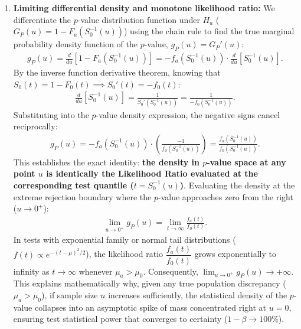 \begin{solproblema}
\begin{enumerate}
		\item \textbf{Limiting differential density and monotone likelihood ratio:}
		We differentiate the $p$-value distribution function under $H_a$ ($G_P(u) = 1 - F_a(S_0^{-1}(u))$) using the chain rule to find the true marginal probability density function of the $p$-value, $g_P(u) = G_P'(u)$:
		\begin{align}
			g_P(u) = \frac{d}{du}\left[ 1 - F_a\left( S_0^{-1}(u) \right) \right] = -f_a\left( S_0^{-1}(u) \right) \cdot \frac{d}{du}\left[ S_0^{-1}(u) \right].
		\end{align}
		By the inverse function derivative theorem, knowing that $S_0(t) = 1 - F_0(t) \implies S_0'(t) = -f_0(t)$:
		\begin{align}
			\frac{d}{du}\left[ S_0^{-1}(u) \right] = \frac{1}{S_0'\left( S_0^{-1}(u) \right)} = \frac{1}{-f_0\left( S_0^{-1}(u) \right)}.
		\end{align}
		Substituting into the $p$-value density expression, the negative signs cancel reciprocally:
		\begin{align}
			g_P(u) = -f_a\left( S_0^{-1}(u) \right) \cdot \left( \frac{-1}{f_0\left( S_0^{-1}(u) \right)} \right) = \frac{f_a\left( S_0^{-1}(u) \right)}{f_0\left( S_0^{-1}(u) \right)}.
		\end{align}
		This establishes the exact identity: \textbf{the density in $p$-value space at any point $u$ is identically the Likelihood Ratio evaluated at the corresponding test quantile ($t = S_0^{-1}(u)$)}.
		Evaluating the density at the extreme rejection boundary where the $p$-value approaches zero from the right ($u \to 0^+$):
		\begin{align}
			\lim_{u \to 0^+} g_P(u) = \lim_{t \to \infty} \frac{f_a(t)}{f_0(t)}.
		\end{align}
		In tests with exponential family or normal tail distributions ($f(t) \propto e^{-(t-\mu)^2/2}$), the likelihood ratio $\dfrac{f_a(t)}{f_0(t)}$ grows exponentially to infinity as $t \to \infty$ whenever $\mu_a > \mu_0$.
		Consequently, $\lim_{u \to 0^+} g_P(u) \to +\infty$.
		This explains mathematically why, given any true population discrepancy ($\mu_a > \mu_0$), if sample size $n$ increases sufficiently, the statistical density of the $p$-value collapses into an asymptotic spike of mass concentrated right at $u = 0$, ensuring test statistical power that converges to certainty ($1-\beta \to 100\%$).
	\end{enumerate}
\end{solproblema}
